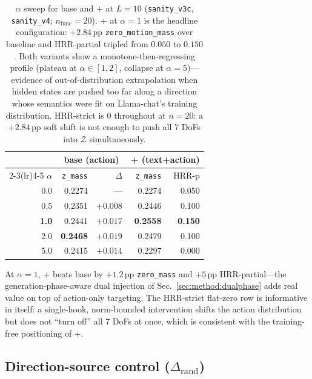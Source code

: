 \begin{table}[t]
\centering\small
\begin{tabular}{r r r r r}
\toprule
 & \multicolumn{2}{c}{base \method{} (action)} & \multicolumn{2}{c}{\method{}+ (text+action)} \\
\cmidrule(lr){2-3}\cmidrule(lr){4-5}
$\alpha$ & \texttt{z\_mass} & $\Delta$ & \texttt{z\_mass} & HRR-p \\
\midrule
0.0 & 0.2274 & --- & 0.2274 & 0.050 \\
0.5 & 0.2351 & $+0.008$ & 0.2446 & 0.100 \\
\textbf{1.0} & 0.2441 & $+0.017$ & \textbf{0.2558} & \textbf{0.150} \\
2.0 & \textbf{0.2468} & $\mathbf{+0.019}$ & 0.2479 & 0.100 \\
5.0 & 0.2415 & $+0.014$ & 0.2297 & 0.000 \\
\bottomrule
\end{tabular}
\caption{$\alpha$ sweep for base \method{} and \method{}+ at $L{=}10$ (\texttt{sanity\_v3c}, \texttt{sanity\_v4}; $n_{\text{func}}{=}20$). \method{}+ at $\alpha{=}1$ is the headline configuration: $+2.84$\,pp \texttt{zero\_motion\_mass} over baseline and HRR-partial tripled from $0.050$ to $0.150$. Both variants show a monotone-then-regressing profile (plateau at $\alpha \in [1,2]$, collapse at $\alpha{=}5$)---evidence of out-of-distribution extrapolation when hidden states are pushed too far along a direction whose semantics were fit on Llama-chat's training distribution. HRR-strict is $0$ throughout at $n{=}20$: a $+2.84$\,pp soft shift is not enough to push all 7 DoFs into $\mathcal{Z}$ simultaneously.}
\label{tab:alpha-plus}
\end{table}

At $\alpha{=}1$, \method{}+ beats base \method{} by $+1.2$\,pp \texttt{zero\_mass} and $+5$\,pp HRR-partial---the generation-phase-aware dual injection of Sec.~\ref{sec:method:dualphase} adds real value on top of action-only targeting. The HRR-strict flat-zero row is informative in itself: a single-hook, norm-bounded intervention shifts the action distribution but does not ``turn off'' all 7 DoFs at once, which is consistent with the training-free positioning of \method{}+.

\subsection{Direction-source control ($\Delta_{\text{rand}}$)}
\label{sec:exp:rand}

